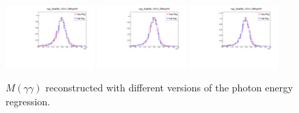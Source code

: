 \begin{figure}[thb]
  \centering
  \includegraphics[width=0.3\textwidth]{figures/sec-photons/mgg_Rad300_13TeV_EBHighR9.pdf}\hfil
  \includegraphics[width=0.3\textwidth]{figures/sec-photons/mgg_Rad600_13TeV_EBHighR9.pdf}\hfil
  \includegraphics[width=0.3\textwidth]{figures/sec-photons/mgg_Rad900_13TeV_EBHighR9.pdf}\hfil
  \caption{$M(\gamma\gamma)$ reconstructed with different versions of the photon energy regression.}
  \label{fig:pho_reg}
\end{figure}
